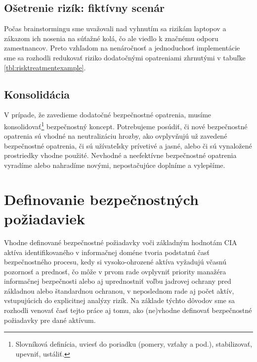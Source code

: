 \subsection*{Ošetrenie rizík: fiktívny scenár}

Počas brainstormingu sme uvažovali nad vyhnutím sa rizikám laptopov a zákazom ich nosenia na súťažné kolá, čo ale viedlo
k značnému odporu zamestnancov. Preto vzhľadom na nenáročnosť a jednoduchosť implementácie sme sa rozhodli redukovať
riziko dodatočnými opatreniami zhrnutými v tabuľke \ref{tbl:risktreatmentexample}.



\newpage

\subsection{Konsolidácia}

V prípade, že zavedieme dodatočné bezpečnostné opatrenia, musíme konsolidovať\footnote{Slovníková definícia, uviesť do
poriadku (pomery, vzťahy a pod.), stabilizovať, upevniť, ustáliť.} bezpečnostný koncept. Potrebujeme posúdiť, či nové
bezpečnostné opatrenia sú vhodné na neutralizáciu hrozby, ako ovplyvňujú už zavedené bezpečnostné opatrenia, či sú
užívateľsky prívetivé a jasné, alebo či sú vynaložené prostriedky vhodne použité. Nevhodné a neefektívne bezpečnostné
opatrenia vyradíme alebo nahradíme novými, nepostačujúce doplníme a vylepšíme.

\section{Definovanie bezpečnostných požiadaviek}

Vhodne definované bezpečnostné požiadavky voči základným hodnotám CIA aktíva identifikovaného v informačnej doméne tvoria podstatnú časť
bezpečnostného procesu, kedy si vysoko-ohrozené aktíva vyžadujú včasnú pozornosť a prednosť, čo môže v prvom rade ovplyvniť priority manažéra
informačnej bezpečnosti alebo aj uprednostniť voľbu jadrovej ochrany pred základnou alebo štandardnou ochranou, v neposlednom rade aj počet aktív,
vstupujúcich do explicitnej analýzy rizík. Na základe týchto dôvodov sme sa rozhodli venovať časť tejto práce aj tomu, ako (ne)vhodne definovať
bezpečnostné požiadavky pre dané aktívum.

